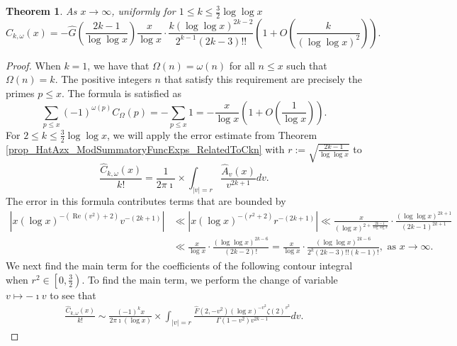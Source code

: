 \documentclass[11pt,reqno,a4letter]{article}
\newcommand{\hlocalref}[1]{\hyperref[#1]{\ref{#1}}}
\numberwithin{equation}{section}
\numberwithin{figure}{section}
\numberwithin{table}{section}
\theoremstyle{plain}
\newtheorem{theorem}{Theorem}
\numberwithin{theorem}{section}
\theoremstyle{definition}
\renewcommand{\Re}{\operatorname{Re}}
\begin{document}
\begin{theorem} 
\label{theorem_CnkSpCasesScaledSummatoryFuncs} 
As $x \rightarrow \infty$, uniformly for $1 \leq k \leq \frac{3}{2}\log\log x$ 
\[
\widehat{C}_{k,\omega}(x) = -\widehat{G}\left(\frac{2k-1}{\log\log x}\right) \frac{x}{\log x} \cdot 
     \frac{k (\log\log x)^{2k-2}}{2^{k-1} (2k-3)!!} \left( 
     1 + O\left(\frac{k}{(\log\log x)^2}\right)\right). 
\]
\end{theorem} 
\begin{proof} 
When $k = 1$, we have that $\Omega(n) = \omega(n)$ for all 
$n \leq x$ such that $\Omega(n) = k$. 
The positive integers $n$ that satisfy this requirement are precisely the primes $p \leq x$. 
The formula is satisfied as 
\begin{equation}
\label{eqn_proof_tag_HatCOmegax_kEQ1_PrimeSum_v1} 
\sum_{p \leq x} (-1)^{\omega(p)} C_{\Omega}(p) = -\sum_{p \leq x} 1 = 
     - \frac{x}{\log x} \left(1 + O\left(\frac{1}{\log x}\right)\right). 
\end{equation}
For $2 \leq k \leq \frac{3}{2}\log\log x$, we will apply the error estimate from 
Theorem \hlocalref{prop_HatAzx_ModSummatoryFuncExps_RelatedToCkn} with 
$r := \sqrt{\frac{2k-1}{\log\log x}}$ to
\[
\frac{\widehat{C}_{k,\omega}(x)}{k!} = \frac{1}{2\pi\imath} \times \int_{|v|=r} 
     \frac{\widehat{A}_{v}(x)}{v^{2k+1}} dv. 
\]
The error in this formula contributes terms that are bounded by 
\begin{align*} 
\left\lvert x (\log x)^{-(\Re(v^2)+2)} v^{-(2k+1)} \right\rvert & \ll 
     \left\lvert x (\log x)^{-(r^2+2)} r^{-(2k+1)} \right\rvert 
     \ll \frac{x}{(\log x)^{2+\frac{2k-1}{\log\log x}}} \cdot 
     \frac{(\log\log x)^{2k+1}}{(2k-1)^{2k+1}} \\ 
     & \ll \frac{x}{\log x} \cdot \frac{(\log\log x)^{2k-6}}{(2k-2)!} = 
	\frac{x}{\log x} \cdot \frac{(\log\log x)^{2k-6}}{2^k (2k-3)!! (k-1)!}, 
     \text{ as } x \rightarrow \infty. 
\end{align*} 
We next find the main term for the coefficients 
of the following contour integral when 
$r^2 \in \left[0, \frac{3}{2}\right)$. 
To find the main term, we perform the change of variable 
$v \mapsto -\imath v$ to see that 
\begin{align} 
\label{eqn_WideTildeArx_CountourIntDef_v1} 
\frac{\widehat{C}_{k,\omega}(x)}{k!} \sim  
     \frac{(-1)^{k} x}{2\pi\imath (\log x)} 
     \times \int_{|v|=r} \frac{\widehat{F}(2, -v^2) (\log x)^{-v^2} \zeta(2)^{v^2}}{\Gamma(1-v^2) v^{2k-1}} dv. 
\end{align} 

\end{proof}
\end{document}
